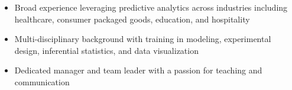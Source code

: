 \begin {cvparagraph}
\begin {itemize}
\vspace {2.0mm}
\item {Broad experience leveraging predictive analytics across industries including healthcare, consumer packaged goods, education, and hospitality}
\item {Multi-disciplinary background with training in modeling, experimental design, inferential statistics, and data visualization}
\item {Dedicated manager and team leader with a passion for teaching and communication}
\end {itemize}
\end {cvparagraph}
